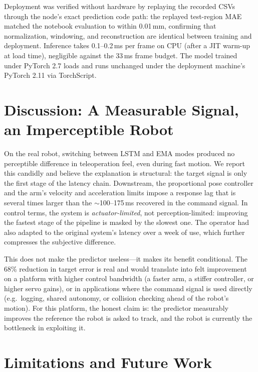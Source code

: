 \documentclass[11pt,a4paper]{article}
\begin{document}
Deployment was verified without hardware by replaying the recorded CSVs
through the node's exact prediction code path: the replayed test-region MAE
matched the notebook evaluation to within 0.01\,mm, confirming that
normalization, windowing, and reconstruction are identical between training
and deployment. Inference takes 0.1--0.2\,ms per frame on CPU (after a JIT
warm-up at load time), negligible against the 33\,ms frame budget. The model
trained under PyTorch 2.7 loads and runs unchanged under the deployment
machine's PyTorch 2.11 via TorchScript.

\section{Discussion: A Measurable Signal, an Imperceptible Robot}
\label{sec:discussion}

On the real robot, switching between LSTM and EMA modes produced no
perceptible difference in teleoperation feel, even during fast motion. We
report this candidly and believe the explanation is structural: the target
signal is only the first stage of the latency chain. Downstream, the
proportional pose controller and the arm's velocity and acceleration limits
impose a response lag that is several times larger than the $\sim$100--175\,ms
recovered in the command signal. In control terms, the system is
\emph{actuator-limited}, not perception-limited: improving the fastest stage
of the pipeline is masked by the slowest one. The operator had also adapted to
the original system's latency over a week of use, which further compresses the
subjective difference.

This does not make the predictor useless---it makes its benefit conditional.
The 68\% reduction in target error is real and would translate into felt
improvement on a platform with higher control bandwidth (a faster arm, a
stiffer controller, or higher servo gains), or in applications where the
command signal is used directly (e.g.\ logging, shared autonomy, or collision
checking ahead of the robot's motion). For this platform, the honest claim is:
the predictor measurably improves the reference the robot is asked to track,
and the robot is currently the bottleneck in exploiting it.

\section{Limitations and Future Work}
\label{sec:limitations}
\end{document}
